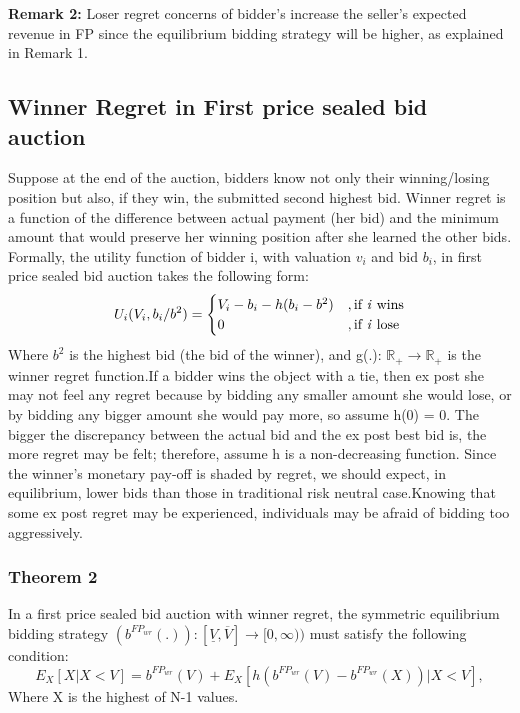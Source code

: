 \documentclass[10pt,a4paper,oneside]{report}
\begin{document}
\begin{flushleft}
\textbf{Remark 2:} Loser regret concerns of bidder's increase the seller's expected revenue in FP since the equilibrium bidding strategy will be higher, as explained in Remark 1.

\subsection{Winner Regret in First price sealed bid auction}
Suppose at the end of the auction, bidders know not only their winning/losing position but also, if they win, the submitted second highest bid. Winner regret is a function of the difference between actual payment (her bid) and the minimum amount that would preserve her winning position after she learned the other bids. Formally, the utility function of bidder i, with valuation $v_i$ and bid $b_i$, in first price sealed bid auction takes the following form:\citep{filizy2005auctions}
\begin{equation*}
U_i(V_i,b_i/b^2) =  
\begin{cases}
V_i-b_i-h(b_i-b^2) &,\text{if \textit{i} wins}
\\
0&,\text{if \textit{i} lose}	
\end{cases}
\end{equation*}
Where $b^2$ is the highest bid (the bid of the winner), and g(.): $\mathds{R}_+ \to \mathds{R}_+$ is the winner regret function.If a bidder wins the object with a tie, then ex post she may not feel any regret because by bidding any smaller amount she would lose, or by bidding any bigger amount she would pay more, so assume h(0) = 0. The bigger the discrepancy between the actual bid and the ex post best bid is, the more regret may be felt; therefore, assume h is a non-decreasing function. Since the winner's monetary pay-off is shaded by regret, we should expect, in equilibrium, lower bids than those in traditional risk neutral case.Knowing that some ex post regret may be experienced, individuals may be afraid of bidding too aggressively.

\subsubsection{Theorem 2}
In a first price sealed bid auction with winner regret, the symmetric equilibrium bidding strategy $(b^{{FP}_{wr}}(.)):[\underline{V} , \overline{V}] \to [0, \infty))$ must satisfy the following condition:\citep{filizy2005auctions}
\begin{equation}
E_X[X|X<V] = b^{{FP}_{wr}}(V)+ E_X[h(b^{{FP}_{wr}}(V)-b^{{FP}_{wr}}(X))|X<V],
\end{equation}
Where X is the highest of N-1 values.


\end{flushleft}
\end{document}
